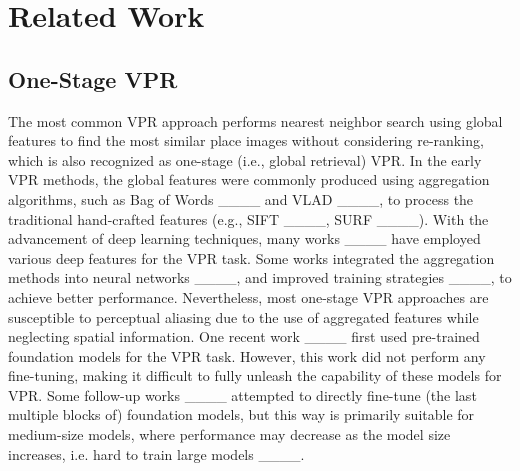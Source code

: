 \section{Related Work}
\subsection{One-Stage VPR}
The most common VPR approach performs nearest neighbor search using global features to find the most similar place images without considering re-ranking, which is also recognized as one-stage (i.e., global retrieval) VPR. In the early VPR methods, the global features were commonly produced using aggregation algorithms, such as Bag of Words ____ and VLAD ____, to process the traditional hand-crafted features (e.g., SIFT ____, SURF ____). With the advancement of deep learning techniques, many works ____ have employed various deep features for the VPR task. Some works integrated the aggregation methods into neural networks ____, and improved training strategies ____, to achieve better performance. Nevertheless, most one-stage VPR approaches are susceptible to perceptual aliasing due to the use of aggregated features while neglecting spatial information. One recent work ____ first used pre-trained foundation models for the VPR task. However, this work did not perform any fine-tuning, making it difficult to fully unleash the capability of these models for VPR. Some follow-up works ____ attempted to directly fine-tune (the last multiple blocks of) foundation models, but this way is primarily suitable for medium-size models, where performance may decrease as the model size increases, i.e. hard to train large models ____.

